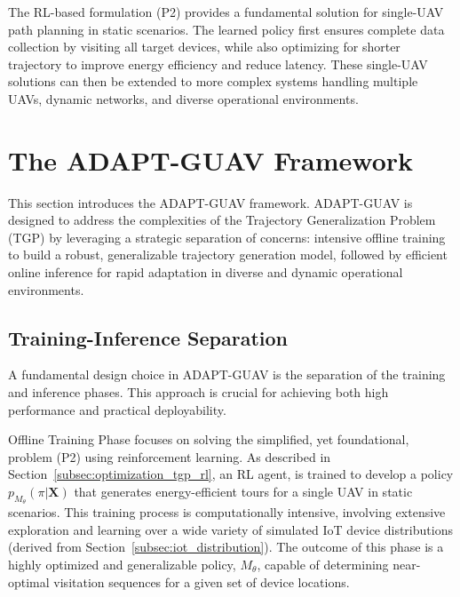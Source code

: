 \documentclass[10pt,conference,letterpaper]{IEEEtran}
\begin{document}
The RL-based formulation (P2) provides a fundamental solution for single-UAV path planning in static scenarios. The learned policy first ensures complete data collection by visiting all target devices, while also optimizing for shorter trajectory to improve energy efficiency and reduce latency. These single-UAV solutions can then be extended to more complex systems handling multiple UAVs, dynamic networks, and diverse operational environments.  

\section{The ADAPT-GUAV Framework}
\label{sec:adapt_uav}

This section introduces the ADAPT-GUAV framework. ADAPT-GUAV is designed to address the complexities of the Trajectory Generalization Problem (TGP) by leveraging a strategic separation of concerns: intensive offline training to build a robust, generalizable trajectory generation model, followed by efficient online inference for rapid adaptation in diverse and dynamic operational environments.

\subsection{Training-Inference Separation}

A fundamental design choice in ADAPT-GUAV is the separation of the training and inference phases. This approach is crucial for achieving both high performance and practical deployability.

Offline Training Phase focuses on solving the simplified, yet foundational, problem (P2) using reinforcement learning. As described in Section~\ref{subsec:optimization_tgp_rl}, an RL agent, is trained to develop a policy $p_{M_{\theta}}(\pi|\mathbf{X})$ that generates energy-efficient tours for a single UAV in static scenarios. This training process is computationally intensive, involving extensive exploration and learning over a wide variety of simulated IoT device distributions (derived from Section~\ref{subsec:iot_distribution}). The outcome of this phase is a highly optimized and generalizable policy, $M_{\theta}$, capable of determining near-optimal visitation sequences for a given set of device locations.
\end{document}
